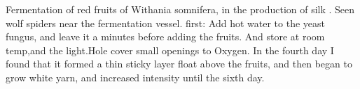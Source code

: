 Fermentation of red fruits of Withania somnifera, in the production of silk .
Seen wolf spiders near the fermentation vessel.
first: Add hot water to the yeast fungus, and leave it a minutes before adding the fruits. And store at room temp,and the light.Hole cover small openings to Oxygen. 
In the fourth day I found that it formed a thin sticky layer float above the fruits, and then began to grow white yarn, and increased intensity until the sixth day.  